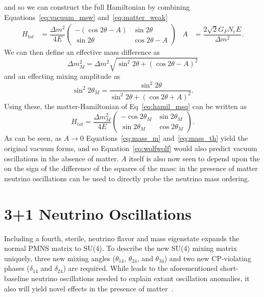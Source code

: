 \documentclass[main.tex]{subfiles}
\begin{document}
and so we can construct the full Hamiltonian by combining Equations~\eqref{eq:vacuum_msw} and~\eqref{eq:matter_weak}
\begin{align}\label{eq:hamil_msq}
    H_{tot} &= \dfrac{\Delta m^{2}}{4E}\left(\begin{array}{cc} -(\cos 2\theta - A) & \sin 2\theta \\ \sin 2\theta & \cos 2\theta - A\end{array}\right) & A&= \dfrac{2\sqrt{2} G_{F} N_{e}E}{\Delta m^{2}}.
\end{align}
We can then define an effective mass difference as 
\begin{equation}\label{eq:mass_m}
    \Delta m_{M}^{2} = \Delta m^{2}\sqrt{\sin^{2}2\theta + (\cos 2\theta - A)^{2}}
\end{equation}
and an effecting mixing amplitude as 
\begin{equation}\label{eq:mass_th}
    \sin^{2} 2\theta_{M} = \dfrac{\sin^{2} 2\theta}{\sin^{2} 2\theta + (\cos 2\theta + A)^{2}}.
\end{equation}
Using these, the matter-Hamiltonian of Eq~\eqref{eq:hamil_msq} can be written as 
\begin{equation}\label{eq:wolfwolf}
    H_{tot} = \dfrac{\Delta m_{M}^{2}}{4E}\left(\begin{array}{cc} -\cos 2\theta_{M} & \sin 2\theta_{M} \\ \sin 2\theta_{M} & \cos 2\theta_{M} \end{array} \right).
\end{equation}
As can be seen, as $A\to 0$ Equations~\ref{eq:mass_m} and~\ref{eq:mass_th} yield the original vacuum forms, and so Equation~\ref{eq:wolfwolf} would also predict vacuum oscillations in the absence of matter. 
$A$ itself is also now seen to depend upon the on the sign of the difference of the squares of the mass: in the presence of matter neutrino oscillations can be used to directly probe the neutrino mass ordering. 

\section{3+1 Neutrino Oscillations}

Including a fourth, sterile, neutrino flavor and mass eigenstate expands the normal PMNS matrix to SU(4). 
To describe the new SU(4) mixing matrix uniquely, three new mixing angles ($\theta_{14}$, $\theta_{24}$, and $\theta_{34}$) and two new CP-violating phases ($\delta_{14}$ and $\delta_{24}$) are required. 
While leads to the aforementioned short-baseline neutrino oscillations needed to explain extant oscillation anomalies, it also will yield novel effects in the presence of matter~\cite{Akhmedov:1988kd,KRASTEV1989341,Chizhov:1998ug, Chizhov_1999, Akhmedov_2000}.
\end{document}
